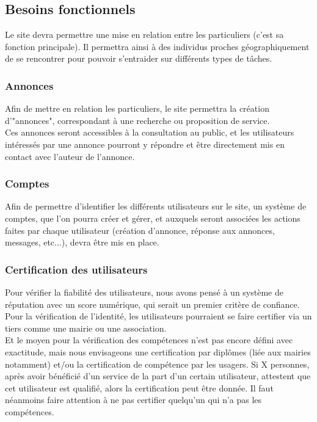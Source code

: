 \documentclass[a4paper,11pt]{article}
\begin{document}

\subsection{Besoins fonctionnels}

Le site devra permettre une mise en relation entre les particuliers (c’est sa fonction principale). Il
permettra ainsi à des individus proches géographiquement de se rencontrer pour pouvoir s’entraider
sur différents types de tâches.\\

\subsubsection{Annonces}

Afin de mettre en relation les particuliers, le site permettra la création d'"annonces", correspondant à une recherche ou proposition de service.\\

Ces annonces seront accessibles à la consultation au public, et les utilisateurs intéressés par une annonce pourront y répondre et être directement mis en contact avec l'auteur de l'annonce.

\subsubsection{Comptes }

Afin de permettre d'identifier les différents utilisateurs sur le site, un système de comptes, que l'on pourra créer et gérer, et auxquels seront associées les actions faites par chaque utilisateur (création d'annonce, réponse aux annonces, messages, etc...), devra être mis en place.

\subsubsection{Certification des utilisateurs}

Pour vérifier la fiabilité des utilisateurs, nous avons pensé à un système de réputation avec un score numérique, qui serait un premier critère de confiance.\\

Pour la vérification de l'identité, les utilisateurs pourraient se faire certifier via un tiers comme une mairie ou une association.\\

Et le moyen pour la vérification des compétences n'est pas encore défini avec exactitude, mais nous envisageons une certification par diplômes (liée aux mairies notamment) et/ou la certification de compétence par les usagers.
Si X personnes, après avoir bénéficié d'un service de la part d'un certain utilisateur, attestent que cet utilisateur est qualifié, alors la certification peut être donnée.
Il faut néanmoins faire attention à ne pas certifier quelqu'un qui n'a pas les compétences.\\
\end{document}

